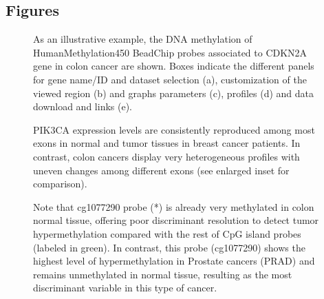 \documentclass{bmcart}
\begin{document}
\begin{backmatter}
% 





\section*{Figures}

\begin{figure}[h!]
  \caption{
As an illustrative example, the DNA methylation of HumanMethylation450 BeadChip probes associated to CDKN2A gene in colon cancer are shown. Boxes indicate the different panels for gene name/ID and dataset selection (a), customization of the viewed region (b) and graphs parameters (c), profiles (d) and data download and links (e). 
}
  \label{fig:1}
\end{figure}


\begin{figure}[h!]
  \caption{
PIK3CA expression levels are consistently reproduced among most exons in normal and tumor tissues in breast cancer patients. In contrast, colon cancers display very heterogeneous profiles with uneven changes among different exons (see enlarged inset for comparison). 
  }
  \label{fig:2}
\end{figure}


\begin{figure}[h!]
  \caption{
Note that cg1077290 probe (*) is already very methylated in colon normal tissue, offering poor discriminant resolution to detect tumor hypermethylation compared with the rest of CpG island probes (labeled in green). In contrast, this probe (cg1077290) shows the highest level of hypermethylation in Prostate cancers (PRAD) and remains unmethylated in normal tissue, resulting as the most discriminant variable in this type of cancer.  
  }
  \label{fig:3}
\end{figure}


\end{backmatter}
\end{document}
